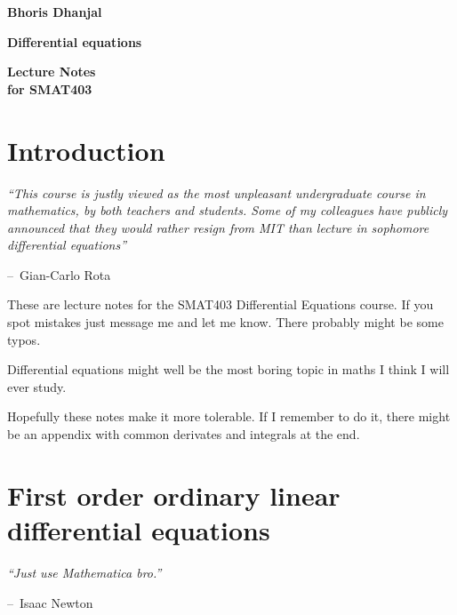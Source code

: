 \documentclass[oneside,11pt,pdftex,final]{book}%
\makeatletter
\numberwithin{equation}{section}
\newenvironment{chapquote}[2][2em]
{\setlength{\@tempdima}{#1}%
	\def\chapquote@author{#2}%
	\parshape 1 \@tempdima \dimexpr\textwidth-2\@tempdima\relax%
	\itshape}
{\par\normalfont\hfill--\ \chapquote@author\hspace*{\@tempdima}\par\bigskip}
\numberwithin{section}{chapter}
\numberwithin{equation}{chapter}
\makeatother
\begin{document}
	
	
	\frontmatter

\thispagestyle{empty}
\begin{flushright}
{\LARGE \textbf{Bhoris Dhanjal}}%
\end{flushright}
\vfill
\begin{center}
{\fontsize{29.86truept}{0truept}\selectfont \textbf{Differential equations}}%
\end{center}
\vfill
\begin{flushleft}
{\LARGE \textbf{Lecture Notes}} \\
\hspace{-1.75truept}
{\large \textbf{for SMAT403}}
\end{flushleft}
\newpage

\tableofcontents


\mainmatter
\chapter*{Introduction}
\begin{chapquote}{Gian-Carlo Rota}
	``This course is justly viewed as the
	most unpleasant undergraduate course in mathematics, by both teachers and students. Some of
	my colleagues have publicly announced that they would rather resign from MIT than lecture in
	sophomore differential equations''
\end{chapquote}
These are lecture notes for the SMAT403 Differential Equations course. If you spot mistakes just message me and let me know. There probably might be some typos.
\par Differential equations might well be the most boring topic in maths I think I will ever study. 
\par Hopefully these notes make it more tolerable. If I remember to do it, there might be an appendix with common derivates and integrals at the end.
\chapter{First order ordinary linear differential equations}
\begin{chapquote}{Isaac Newton}
	``Just use Mathematica bro.''
\end{chapquote}
\end{document}
